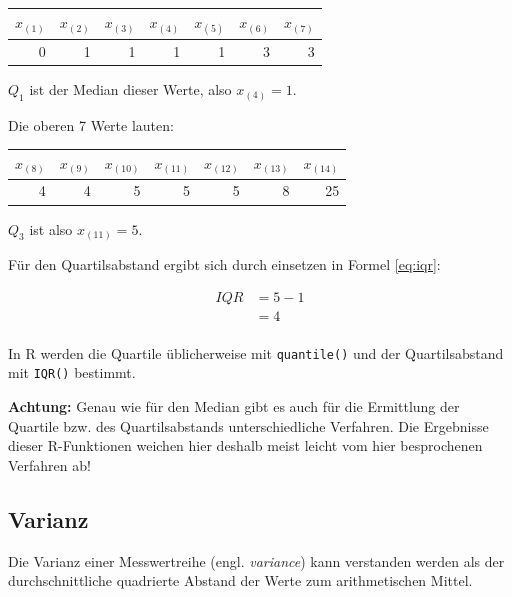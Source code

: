 \documentclass[
  11pt,
  ngerman,
  a4paper,
]{report}
\newenvironment{rtip}{
  \medskip
  \begin{tcolorbox}[colframe=purple,colback=light_gray,title=Softwarehinweis]
}{
  \end{tcolorbox}
  \medskip
}
\begin{document}
\begin{table}[H]
\centering
\begin{tabular}{rrrrrrr}
\toprule
$x_{(1)}$ & $x_{(2)}$ & $x_{(3)}$ & $x_{(4)}$ & $x_{(5)}$ & $x_{(6)}$ & $x_{(7)}$\\
\midrule
0 & 1 & 1 & 1 & 1 & 3 & 3\\
\bottomrule
\end{tabular}
\end{table}

\(Q_1\) ist der Median dieser Werte, also \(x_{(4)}=1\).

Die oberen 7 Werte lauten:

\begin{table}[H]
\centering
\begin{tabular}{rrrrrrr}
\toprule
$x_{(8)}$ & $x_{(9)}$ & $x_{(10)}$ & $x_{(11)}$ & $x_{(12)}$ & $x_{(13)}$ & $x_{(14)}$\\
\midrule
4 & 4 & 5 & 5 & 5 & 8 & 25\\
\bottomrule
\end{tabular}
\end{table}

\(Q_3\) ist also \(x_{(11)} = 5\).

Für den Quartilsabstand ergibt sich durch einsetzen in Formel \eqref{eq:iqr}:

\[
  \begin{aligned}
    \mathit{IQR}&=5-1 \\[4pt]
       &=4 \\[4pt]
  \end{aligned}
\]

\begin{rtip}
In R werden die Quartile üblicherweise mit \verb|quantile()| und der Quartilsabstand mit \verb|IQR()| bestimmt.
\end{rtip}

\textbf{Achtung:} Genau wie für den Median gibt es auch für die Ermittlung der Quartile bzw. des Quartilsabstands unterschiedliche Verfahren. Die Ergebnisse dieser R-Funktionen weichen hier deshalb meist leicht vom hier besprochenen Verfahren ab!

\hypertarget{varianz}{%
\subsection{Varianz}\label{varianz}}

Die Varianz einer Messwertreihe (engl. \emph{variance}) kann verstanden werden als der durchschnittliche quadrierte Abstand der Werte zum arithmetischen Mittel.
\end{document}
